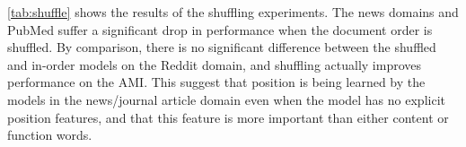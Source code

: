 \autoref{tab:shuffle} shows the results
of the shuffling experiments. 
The news domains and PubMed suffer a significant drop in performance 
when the document order is shuffled. By comparison, there is no significant difference between the shuffled and in-order models on 
the Reddit domain, and shuffling actually improves performance on the AMI.
This suggest that position 
is being learned by the models in the news/journal article domain even when 
the model has no explicit position features, and that this feature is more 
important than either content or function words.





%

